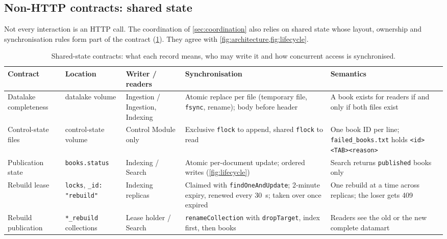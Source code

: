 \documentclass[10pt,a4paper]{article}
\newcommand{\code}[1]{\texttt{#1}}
\begin{document}
\subsection{Non-HTTP contracts: shared state}
\label{sec:shared-state-contracts}

Not every interaction is an HTTP call. The coordination of
\cref{sec:coordination} also relies on shared state whose layout, ownership and
synchronisation rules form part of the contract (\cref{tab:shared-state}).
They agree with \cref{fig:architecture,fig:lifecycle}.

\begin{table}[htbp]
  \centering
  \footnotesize
  \caption{Shared-state contracts: what each record means, who may write it and
  how concurrent access is synchronised.}
  \label{tab:shared-state}
  \begin{tabularx}{\textwidth}{@{}>{\raggedright\arraybackslash}p{2.5cm}>{\raggedright\arraybackslash}p{2.2cm}>{\raggedright\arraybackslash}p{2.35cm}>{\raggedright\arraybackslash}p{3.4cm}>{\raggedright\arraybackslash}X@{}}
    \toprule
    Contract & Location & Writer / readers & Synchronisation & Semantics \\
    \midrule
    Datalake completeness & datalake volume & Ingestion / Ingestion, Indexing &
      Atomic replace per file (temporary file, \code{fsync}, rename); body
      before header & A book exists for readers if and only if both files exist \\
    Control-state files & control-state volume & Control Module only &
      Exclusive \code{flock} to append, shared \code{flock} to read & One book ID
      per line; \code{failed\_books.txt} holds \code{<id><TAB><reason>} \\
    Publication state & \code{books.status} & Indexing / Search & Atomic
      per-document update; ordered writes (\cref{fig:lifecycle}) & Search returns
      \code{published} books only \\
    Rebuild lease & \code{locks}, \code{\_id: "rebuild"} & Indexing replicas &
      Claimed with \code{findOneAndUpdate}; 2-minute expiry, renewed every 30~s;
      taken over once expired & One rebuild at a time across replicas; the
      loser gets 409 \\
    Rebuild publication & \code{*\_rebuild} collections & Lease holder / Search &
      \code{renameCollection} with \code{dropTarget}, index first, then books &
      Readers see the old or the new complete datamart \\
    \bottomrule
  \end{tabularx}
\end{table}
\end{document}
